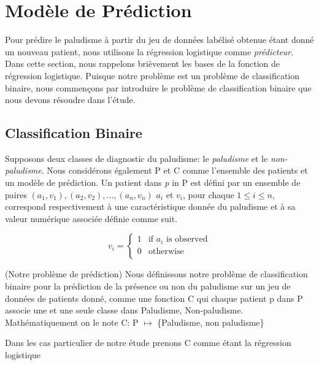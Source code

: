 \section{Modèle de Prédiction}\label{Modèle de Prédiction}
Pour prédire le paludisme à partir du jeu de données labélisé obtenue étant donné un nouveau patient, nous utilisons la régression logistique comme \emph{prédicteur}. Dans cette section, nous rappelons brièvement les bases de la fonction de régression logistique. Puisque notre problème est un problème de classification binaire, nous commençons par introduire le problème de classification binaire que nous devons résoudre dans l'étude.
\subsection{Classification Binaire}
Supposons deux classes de diagnostic du paludisme: le \emph{paludisme} et le \emph{non-paludisme}. Nous considérons également \textsc{P} et \textsc{C} comme l’ensemble des patients et un modèle de prédiction. Un patient dans \emph{p} in \textsc{P} est défini par un ensemble de paires $(a_1, v_1), (a_2, v_2), \ldots, (a_n, v_n)$  $a_i$ et $v_i$, pour chaque $1\leq i\leq n$, correspond respectivement à une caractéristique donnée du paludisme et à sa valeur numérique associée définie comme suit.
        
\begin{equation}
v_i = \left\{
\begin{array}{rl}
1 &\text{if $a_i$ is observed} \\
0 &\text{otherwise} \\
\end{array}
\right.
\end{equation}
\begin{definition}{(Notre problème de prédiction)}  Nous définissons notre problème de classification binaire pour la prédiction de la présence ou non du paludisme sur un jeu  de données de patients donné, comme une fonction \textsc{C} qui chaque patient p dans \textsc{P} associe une et une seule classe dans {Paludisme, Non-paludisme}.
Mathématiquement on le note \textsc{C}: \textsc{P} $\mapsto$ \{Paludisme, non paludisme\}
\end{definition}
Dans les cas particulier de notre étude prenons \textsc{C} comme étant la régression logistique
